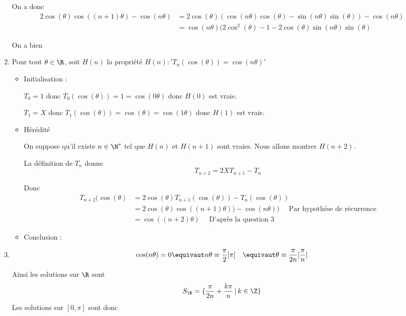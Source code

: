 \documentclass[a4paper, 11pt,reqno]{article}
\begin{document}
\begin{correction}
\begin{enumerate}
On a donc 
\begin{align*}
2\cos(\theta)\cos((n+1)\theta) -\cos(n\theta)  &= 2\cos(\theta) ( \cos(n\theta)\cos(\theta) -\sin(n\theta) \sin(\theta)) -\cos(n\theta)\\
&= \cos(n\theta)( 2\cos^2(\theta)-1 -2 \cos(\theta) \sin(n\theta) \sin(\theta)
\end{align*}

On a bien 


\item Pour tout $\theta \in \R$, soit $H(n)$ la propriété $H(n) : 'T_n(\cos(\theta)) = \cos(n\theta)'$

\begin{itemize}
\item Initialisation :

$T_0 =1 $ donc $T_0(\cos(\theta) ) =1 =\cos(0\theta)$ donc $H(0) $ est vraie. 

$T_1= X$ donc $T_1(\cos(\theta) ) =\cos(\theta) =\cos(1\theta)$ donc $H(1) $ est vraie. 

\item Hérédité 

On suppose qu'il existe $n\in \N^*$ tel que $H(n) $ et $H(n+1)$ sont vraies. 
Nous allons montrer $H(n+2)$.

La définition de $T_n$ donne 
$$T_{n+2} =2XT_{n+1} -T_n$$

Donc 
\begin{align*}
T_{n+2}(\cos(\theta) &= 2\cos(\theta)T_{n+1} (\cos(\theta))-T_n(\cos(\theta))\\
 &= 2\cos(\theta) \cos((n+1)\theta))-\cos(n\theta))\quad \text{ Par hypothése de récurrence}\\
 &= \cos((n+2)\theta) \quad \text{ D'après la question 3}
\end{align*}

\item Conclusion :

\end{itemize}


\item 
\begin{align*}
\cos(n\theta) =0 &\equivaut n\theta \equiv \frac{\pi}{2}[\pi]
					&\equivaut \theta \equiv \frac{\pi}{2n}[\frac{\pi}{n}]
\end{align*}

Ainsi les solutions sur $\R$ sont $$S_\R=\{ \frac{\pi}{2n}+\frac{k\pi}{n}\, |\, k\in \Z\}$$
Les solutions sur $[0, \pi]$ sont donc 



\end{enumerate}
\end{correction}
\end{document}
